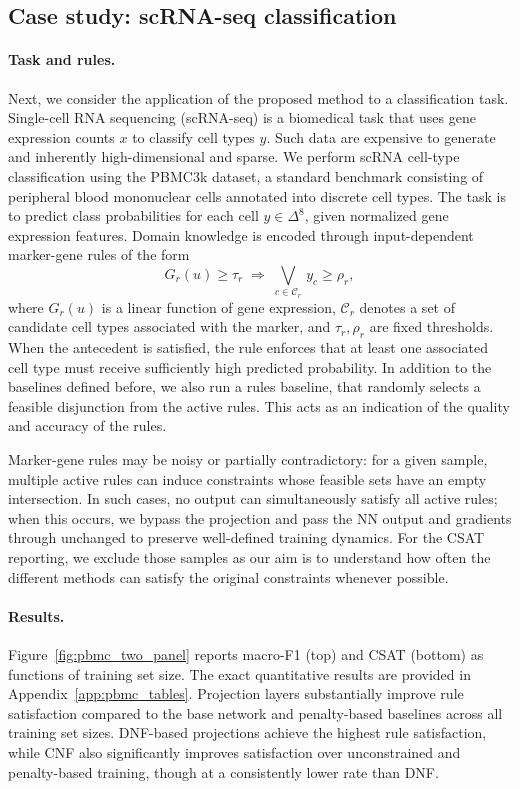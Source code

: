 \documentclass{article}
\theoremstyle{plain}
\theoremstyle{definition}
\theoremstyle{remark}
\begin{document}
\subsection{Case study: scRNA-seq classification}

\paragraph{Task and rules.}
Next, we consider the application of the proposed method to a classification task. Single-cell RNA sequencing (scRNA-seq) is a biomedical task that uses gene expression counts $x$ to classify cell types $y$. Such data are expensive to generate and inherently high-dimensional and sparse. We perform scRNA cell-type classification using the PBMC3k dataset, a standard benchmark consisting of peripheral blood mononuclear cells annotated into discrete cell types. The task is to predict class probabilities for each cell $y \in \Delta^8$, given normalized gene expression features.
Domain knowledge is encoded through input-dependent marker-gene rules of the form
\begin{equation}
G_r(u) \ge \tau_r \;\Rightarrow\; \bigvee_{c \in \mathcal{C}_r} \, y_c \ge \rho_r,
\end{equation}
where $G_r(u)$ is a linear function of gene expression, $\mathcal{C}_r$ denotes a set of candidate cell types associated with the marker, and $\tau_r, \rho_r$ are fixed thresholds. When the antecedent is satisfied, the rule enforces that at least one associated cell type must receive sufficiently high predicted probability.  In addition to the baselines defined before, we also run a rules baseline, that randomly selects a feasible disjunction from the active rules. This acts as an indication of the quality and accuracy of the rules.

Marker-gene rules may be noisy or partially contradictory: for a given sample, multiple active rules can induce constraints whose feasible sets have an empty intersection. In such cases, no output can simultaneously satisfy all active rules; when this occurs, we bypass the projection and pass the NN output and gradients through unchanged to preserve well-defined training dynamics. For the CSAT reporting, we exclude those samples as our aim is to understand how often the different methods can satisfy the original constraints whenever possible.


\paragraph{Results.}
Figure~\ref{fig:pbmc_two_panel} reports macro-F1 (top) and CSAT (bottom) as functions of training set size. The exact quantitative results are provided in Appendix~\ref{app:pbmc_tables}. Projection layers substantially improve rule satisfaction compared to the base network and penalty-based baselines across all training set sizes. DNF-based projections achieve the highest rule satisfaction, while CNF also significantly improves satisfaction over unconstrained and penalty-based training, though at a consistently lower rate than DNF.
\end{document}
